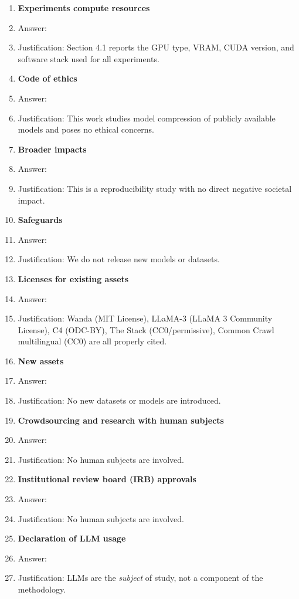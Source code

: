 \documentclass{article}
\begin{document}
\begin{enumerate}
\item {\bf Experiments compute resources}
    \item[] Answer: \answerYes{}
    \item[] Justification: Section 4.1 reports the GPU type, VRAM, CUDA
    version, and software stack used for all experiments.

\item {\bf Code of ethics}
    \item[] Answer: \answerYes{}
    \item[] Justification: This work studies model compression of
    publicly available models and poses no ethical concerns.

\item {\bf Broader impacts}
    \item[] Answer: \answerNA{}
    \item[] Justification: This is a reproducibility study with no direct
    negative societal impact.

\item {\bf Safeguards}
    \item[] Answer: \answerNA{}
    \item[] Justification: We do not release new models or datasets.

\item {\bf Licenses for existing assets}
    \item[] Answer: \answerYes{}
    \item[] Justification: Wanda (MIT License),
    LLaMA-3 (LLaMA 3 Community License), C4 (ODC-BY), The Stack (CC0/permissive),
    Common Crawl multilingual (CC0) are all properly cited.

\item {\bf New assets}
    \item[] Answer: \answerNA{}
    \item[] Justification: No new datasets or models are introduced.

\item {\bf Crowdsourcing and research with human subjects}
    \item[] Answer: \answerNA{}
    \item[] Justification: No human subjects are involved.

\item {\bf Institutional review board (IRB) approvals}
    \item[] Answer: \answerNA{}
    \item[] Justification: No human subjects are involved.

\item {\bf Declaration of LLM usage}
    \item[] Answer: \answerNA{}
    \item[] Justification: LLMs are the \emph{subject} of study, not
    a component of the methodology.

\end{enumerate}
\end{document}
